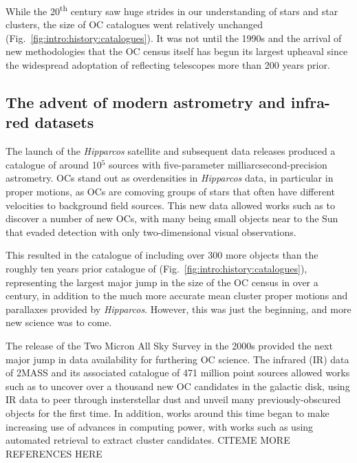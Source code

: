 While the 20\textsuperscript{th} century saw huge strides in our understanding of stars and star clusters, the size of OC catalogues went relatively unchanged (Fig.~\ref{fig:intro:history:catalogues}). It was not until the 1990s and the arrival of new methodologies that the OC census itself has begun its largest upheaval since the widespread adoptation of reflecting telescopes more than 200 years prior.


\subsection{The advent of modern astrometry and infra-red datasets}

The launch of the \emph{Hipparcos} satellite and subsequent data releases \citep{perryman_hipparcos_1997} produced a catalogue of around 10$^5$ sources with five-parameter milliarcsecond-precision astrometry. OCs stand out as overdensities in \emph{Hipparcos} data, in particular in proper motions, as OCs are comoving groups of stars that often have different velocities to background field sources. This new data allowed works such as \cite{platais_search_1998} to discover a number of new OCs, with many being small objects near to the Sun that evaded detection with only two-dimensional visual observations. 

This resulted in the catalogue of \cite{dias_new_2002} including over 300 more objects than the roughly ten years prior catalogue of \cite{mermilliod_database_1995} (Fig.~\ref{fig:intro:history:catalogues}), representing the largest 
major jump in the size of the OC census in over a century, in addition to the much more accurate mean cluster proper motions and parallaxes provided by \emph{Hipparcos}. However, this was just the beginning, and more new science was to come.

The release of the Two Micron All Sky Survey \citep[2MASS,][]{skrutskie_two_2006} in the 2000s provided the next major jump in data availability for furthering OC science. The infrared (IR) data of 2MASS and its associated catalogue of 471 million point sources allowed works such as \cite{froebrich_systematic_2007} to uncover over a thousand new OC candidates in the galactic disk, using IR data to peer through insterstellar dust and unveil many previously-obscured objects for the first time. In addition, works around this time began to make increasing use of advances in computing power, with works such as \cite{froebrich_systematic_2007} using automated retrieval to extract cluster candidates. CITEME MORE REFERENCES HERE

